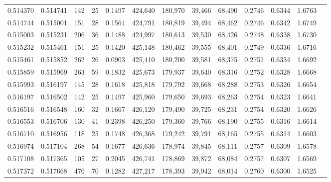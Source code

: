 \begin{tabular}{rrrrrrrrrrrrr}
0.514370 & 0.514741 &   142 &  25 &                                     0.1497 & 424,640 & 180,970 &  39,466 &  68,490 & 0.2746 & 0.6344 & 1.6763 \\
0.514744 & 0.515001 &   151 &  28 &                                     0.1564 & 424,791 & 180,819 &  39,494 &  68,462 & 0.2746 & 0.6342 & 1.6749 \\
0.515003 & 0.515231 &   206 &  36 &                                     0.1488 & 424,997 & 180,613 &  39,530 &  68,426 & 0.2748 & 0.6338 & 1.6730 \\
0.515232 & 0.515461 &   151 &  25 &                                     0.1420 & 425,148 & 180,462 &  39,555 &  68,401 & 0.2749 & 0.6336 & 1.6716 \\
0.515461 & 0.515852 &   262 &  26 &                                     0.0903 & 425,410 & 180,200 &  39,581 &  68,375 & 0.2751 & 0.6334 & 1.6692 \\
0.515859 & 0.515969 &   263 &  59 &                                     0.1832 & 425,673 & 179,937 &  39,640 &  68,316 & 0.2752 & 0.6328 & 1.6668 \\
0.515993 & 0.516197 &   145 &  28 &                                     0.1618 & 425,818 & 179,792 &  39,668 &  68,288 & 0.2753 & 0.6326 & 1.6654 \\
0.516197 & 0.516502 &   142 &  25 &                                     0.1497 & 425,960 & 179,650 &  39,693 &  68,263 & 0.2754 & 0.6323 & 1.6641 \\
0.516516 & 0.516548 &   160 &  32 &                                     0.1667 & 426,120 & 179,490 &  39,725 &  68,231 & 0.2754 & 0.6320 & 1.6626 \\
0.516553 & 0.516706 &   130 &  41 &                                     0.2398 & 426,250 & 179,360 &  39,766 &  68,190 & 0.2755 & 0.6316 & 1.6614 \\
0.516710 & 0.516956 &   118 &  25 &                                     0.1748 & 426,368 & 179,242 &  39,791 &  68,165 & 0.2755 & 0.6314 & 1.6603 \\
0.516974 & 0.517104 &   268 &  54 &                                     0.1677 & 426,636 & 178,974 &  39,845 &  68,111 & 0.2757 & 0.6309 & 1.6578 \\
0.517108 & 0.517365 &   105 &  27 &                                     0.2045 & 426,741 & 178,869 &  39,872 &  68,084 & 0.2757 & 0.6307 & 1.6569 \\
0.517372 & 0.517668 &   476 &  70 &                                     0.1282 & 427,217 & 178,393 &  39,942 &  68,014 & 0.2760 & 0.6300 & 1.6525 \\

\end{tabular}
